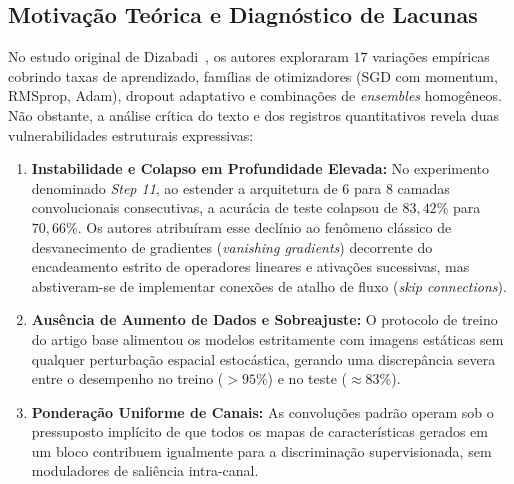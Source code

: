 \documentclass[runningheads]{llncs}
\begin{document}
\subsection{Motiva\c{c}\~{a}o Te\'{o}rica e Diagn\'{o}stico de Lacunas}
No estudo original de Dizabadi~\cite{dizabadi2026empirical}, os autores exploraram $17$ varia\c{c}\~{o}es emp\'{i}ricas cobrindo taxas de aprendizado, fam\'{i}lias de otimizadores (SGD com momentum, RMSprop, Adam), dropout adaptativo e combina\c{c}\~{o}es de \textit{ensembles} homog\^{e}neos. N\~{a}o obstante, a an\'{a}lise cr\'{i}tica do texto e dos registros quantitativos revela duas vulnerabilidades estruturais expressivas:
\begin{enumerate}
    \item \textbf{Instabilidade e Colapso em Profundidade Elevada:} No experimento denominado \textit{Step 11}, ao estender a arquitetura de $6$ para $8$ camadas convolucionais consecutivas, a acur\'{a}cia de teste colapsou de $83{,}42\%$ para $70{,}66\%$. Os autores atribu\'{i}ram esse decl\'{i}nio ao fen\^{o}meno cl\'{a}ssico de desvanecimento de gradientes (\textit{vanishing gradients}) decorrente do encadeamento estrito de operadores lineares e ativa\c{c}\~{o}es sucessivas, mas abstiveram-se de implementar conex\~{o}es de atalho de fluxo (\textit{skip connections}).
    \item \textbf{Aus\^{e}ncia de Aumento de Dados e Sobreajuste:} O protocolo de treino do artigo base alimentou os modelos estritamente com imagens est\'{a}ticas sem qualquer perturba\c{c}\~{a}o espacial estoc\'{a}stica, gerando uma discrep\^{a}ncia severa entre o desempenho no treino ($> 95\%$) e no teste ($\approx 83\%$).
    \item \textbf{Pondera\c{c}\~{a}o Uniforme de Canais:} As convolu\c{c}\~{o}es padr\~{a}o operam sob o pressuposto impl\'{i}cito de que todos os mapas de caracter\'{i}sticas gerados em um bloco contribuem igualmente para a discrimina\c{c}\~{a}o supervisionada, sem moduladores de sali\^{e}ncia intra-canal.
\end{enumerate}
\end{document}
